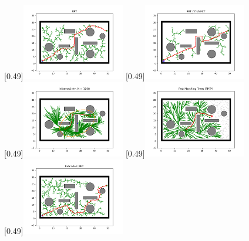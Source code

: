 \documentclass[master,academic]{ysuthesis} %
\begin{document}
		\begin{figure}[!ht]
			\centering
			[0.49\textwidth]{\includegraphics[width=0.4\textwidth]{插图/rrt/RRT.png}}
			[0.49\textwidth]{\includegraphics[width=0.4\textwidth]{插图/rrt/RRT_connect.png}}
			[0.49\textwidth]{\includegraphics[width=0.4\textwidth]{插图/rrt/informed_RRTstar.png}}
			[0.49\textwidth]{\includegraphics[width=0.4\textwidth]{插图/rrt/fast_matching_trees.png}}
			[0.49\textwidth]{\includegraphics[width=0.4\textwidth]{插图/rrt/extended_RRT.png}}

\end{figure}
\end{document}
